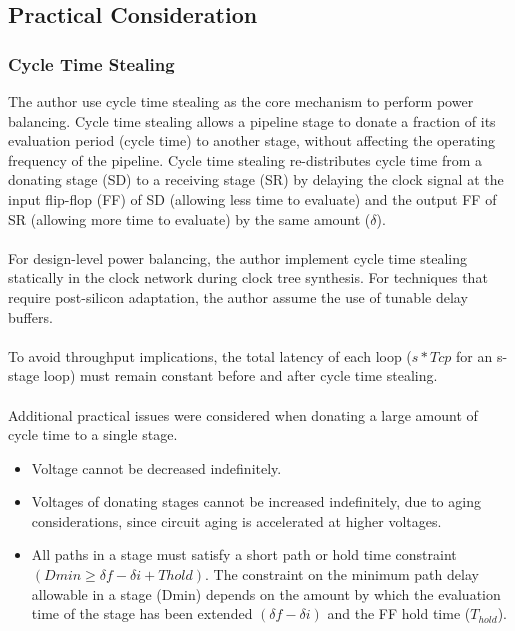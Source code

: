 \documentclass{article}
\begin{document}
\subsection{Practical Consideration}
\subsubsection{Cycle Time Stealing}
The author use cycle time stealing as the core mechanism to perform power balancing. Cycle time stealing allows a pipeline stage to donate a fraction of its evaluation
period (cycle time) to another stage, without affecting the operating frequency of the pipeline. Cycle time stealing re-distributes cycle time from a donating stage (SD) to a
receiving stage (SR) by delaying the clock signal at the input flip-flop (FF) of SD (allowing less time to evaluate) and the output FF of SR (allowing more time to evaluate) by the same amount ($\delta$).\\\\
For design-level power balancing, the author implement cycle time stealing statically in the clock network during clock tree synthesis. For techniques that require post-silicon
adaptation, the author assume the use of tunable delay buffers.\\\\
To avoid throughput implications, the total latency of each loop ($s \ast  Tcp$ for an
s-stage loop) must remain constant before and after cycle time stealing.\\\\
Additional practical issues were considered when donating a large amount of cycle time to a single stage.
\begin{itemize}
    \item Voltage cannot be decreased indefinitely.
    \item Voltages of donating stages cannot be increased indefinitely, due to aging considerations, since circuit aging is accelerated at higher voltages.
    \item All paths in a stage must satisfy a short path or hold time constraint
    $(Dmin ≥ \delta f - \delta i + Thold)$. The constraint on the minimum path delay allowable in a stage (Dmin) depends on the amount by which the evaluation time of the stage has been extended $(\delta f - \delta i)$ and the FF hold time ($T_{hold}$).
\end{itemize}
\end{document}
